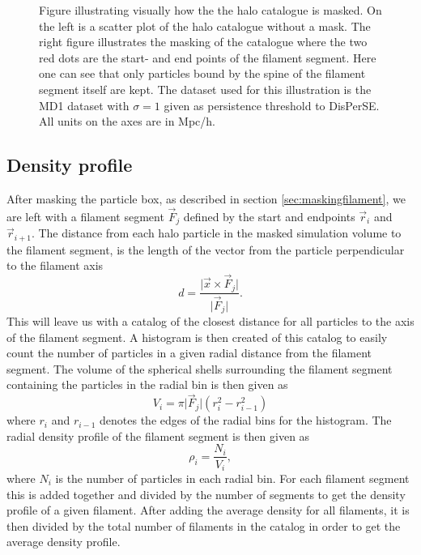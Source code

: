 \begin{figure}[htbp]
    \hspace{1em}%
    \caption{Figure illustrating visually how the the halo catalogue is masked. On the left is a scatter plot of the halo catalogue without a mask. The right figure illustrates the masking of the catalogue where the two red dots are the start- and end points of the filament segment. Here one can see that only particles bound by the spine of the filament segment itself are kept. The dataset used for this illustration is the MD1 dataset with $\sigma=1$ given as persistence threshold to DisPerSE. All units on the axes are in Mpc/h.}
    \label{fig:galaxy_catbbox}
\end{figure}
\subsection{Density profile}\label{sec:filamentdensity}
After masking the particle box, as described in section \ref{sec:maskingfilament},
we are left with a filament segment $\vec{F}_j$ defined by the start and
endpoints $\vec{r}_{i}$ and $\vec{r}_{i+1}$. The distance from each halo particle in
the masked simulation volume to the filament segment, is the length of the vector
from the particle perpendicular to the filament axis
\begin{equation}\label{eq:distance_from_filament}
    d=\frac{\vert \vec{x}\times\vec{F}_j\vert}{\vert \vec{F}_j\vert}.
\end{equation}
This will leave us with a catalog of the closest distance for all particles to
the axis of the filament segment. A histogram is then created of this catalog
to easily count the number of particles in a given radial distance from the
filament segment. The volume of the spherical shells surrounding the filament segment
containing the particles in the radial bin is then given as
\begin{equation}
    V_i={\pi\vert \vec{F}_j\vert(r_i^2-r_{i-1}^2)}
\end{equation}
where $r_i$ and $r_{i-1}$ denotes the edges of the radial bins for the histogram.
The radial density profile of the filament segment is then given as
\begin{equation}
    \rho_i=\frac{N_i}{V_i},
\end{equation}
where $N_i$ is the number of particles in each radial bin. For each filament segment
this is added together and divided by the number of segments to get the density profile of a given filament. After adding the average density for all filaments, it is then divided by the total number of filaments in the catalog in order to get the average density profile.
